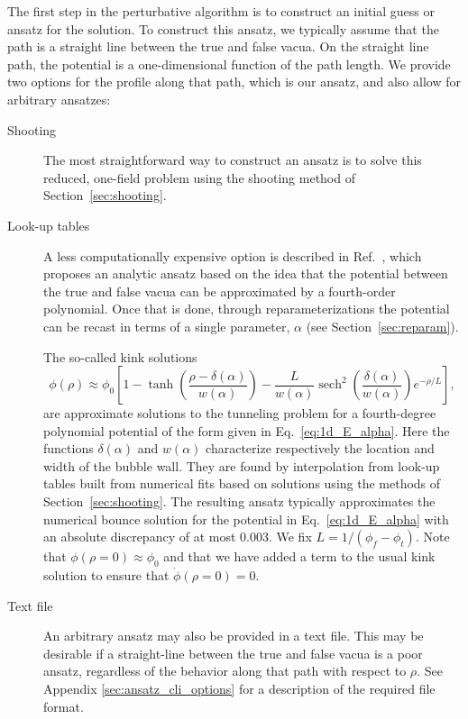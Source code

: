 \documentclass[final,3p,11pt,pdflatex]{elsarticle}
\newcommand{\secref}[1]{Section~\ref{#1}}
\renewcommand{\refeq}[1]{Eq.~\ref{#1}}
\newcommand{\refcite}[1]{Ref.~\cite{#1}}
\newcommand{\fv}{\ensuremath{\phi_f}}
\newcommand{\tv}{\ensuremath{\phi_t}}
\DeclareMathOperator{\sech}{sech}
\begin{document}
The first step in the perturbative algorithm is to construct an initial guess
or ansatz for the solution.  To construct this ansatz, we typically assume that
the path is a straight line between the true and false vacua.  On the straight
line path, the potential is a one-dimensional function of the path length.  We
provide two options for the profile along that path, which is our ansatz, and
also allow for arbitrary ansatzes:
\begin{description}

\item[Shooting] The most straightforward way to construct an ansatz is to solve
  this reduced, one-field problem using the shooting method of
  \secref{sec:shooting}.

\item[Look-up tables] A less computationally expensive option is described in
  \refcite{Akula:2016gpl}, which proposes an analytic ansatz based on the
  idea that the potential between the true and false vacua can be approximated
  by a fourth-order polynomial.  Once that is done, through reparameterizations
  the potential can be recast in terms of a single parameter, $\alpha$ (see
  \secref{sec:reparam}).

The so-called kink solutions
\begin{equation}\label{eq:kink_ansatz}
    \phi(\rho) \approx \phi_0
\left[
     1 - \tanh \left(\frac{\rho - \delta(\alpha)}{w(\alpha)} \right)
     - \frac{L}{w(\alpha)} \sech^2\left(\frac{\delta(\alpha)}{w(\alpha)}\right)
     e^{-\rho / L}
\right],
\end{equation}
are approximate solutions to the tunneling problem for a fourth-degree
polynomial potential of the form given in \refeq{eq:1d_E_alpha}.  Here
the functions $\delta(\alpha)$ and $w(\alpha)$
characterize respectively the location and width of the bubble wall.  They are
found by interpolation from look-up tables built from numerical fits based on
solutions using the methods of \secref{sec:shooting}.  The resulting ansatz
typically approximates the numerical bounce solution for the potential
in \refeq{eq:1d_E_alpha} with an absolute discrepancy of at most $0.003$.
We fix $L = 1 / (\fv - \tv)$. Note that $\phi(\rho = 0)
\approx \phi_0$ and that we have added a term to the usual kink solution to
ensure that $\dot\phi(\rho = 0) = 0$.

\item[Text file] An arbitrary ansatz may also be provided in a text file.  This
  may be desirable if a straight-line between the true and false vacua is a poor
  ansatz, regardless of the behavior along that path with respect to $\rho$.
  See Appendix \ref{sec:ansatz_cli_options} for a description of the required
  file format.

\end{description}
\end{document}
